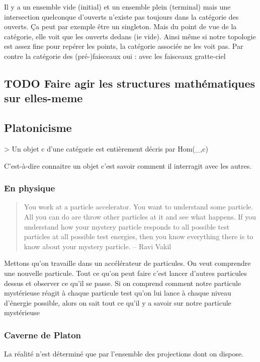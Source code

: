\documentclass[11pt]{article}
\begin{document}
Il y a un ensemble vide (initial) et un ensemble plein (terminal) mais une intersection quelconque d'ouverts n'existe pas toujours dans la catégorie des ouverts. Ça peut par exemple être un singleton. Mais du point de vue de la catégorie, elle voit que les ouverts dedans (ie vide). Ainsi même si notre topologie est assez fine pour repérer les points, la catégorie associée ne les voit pas.
Par contre la catégorie des (pré-)faisceaux oui : avec les faisceaux gratte-ciel
\subsection{\textbf{TODO} Faire agir les structures mathématiques sur elles-meme}
\label{sec-2-2}
\subsection{Platonicisme}
\label{sec-2-3}

> Un objet c d'une catégorie est entièrement décris par Hom(_,c)

C'est-à-dire connaitre un objet c'est savoir comment il interragit avec les autres.
\subsubsection{En physique}
\label{sec-2-3-1}

\begin{quote}
You work at a particle accelerator. You want to understand some particle. All you can do are throw other particles at it and see what happens. If you understand how your mystery particle responds to all possible test particles at all possible test energies, then you know
everything there is to know about your mystery particle.  -- Ravi Vakil
\end{quote}

Mettons qu'on travaille dans un accélérateur de particules. On veut comprendre une nouvelle particule. Tout ce qu'on peut faire c'est lancer d'autres particules dessus et observer ce qu'il se passe. Si on comprend comment notre particule mystérieuse réagit à chaque particule test qu'on lui lance à chaque niveau d'énergie possible, alors on sait tout ce qu'il y a savoir sur notre particule mystérieuse
\subsubsection{Caverne de Platon}
\label{sec-2-3-2}

La réalité n'est déterminé que par l'ensemble des projections dont on dispose.
\end{document}
